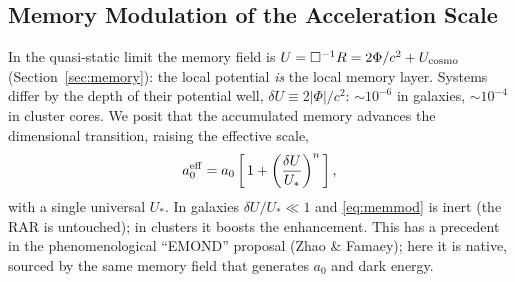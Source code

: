 \documentclass[11pt,a4paper]{article}
\begin{document}
\begin{onehalfspacing}
\subsection{Memory Modulation of the Acceleration Scale}
In the quasi-static limit the memory field is $U=\Box^{-1}R = 2\Phi/c^2 + U_{\rm cosmo}$ (Section~\ref{sec:memory}): the local potential \emph{is} the local memory layer. Systems differ by the depth of their potential well, $\delta U \equiv 2|\Phi|/c^2$: $\sim10^{-6}$ in galaxies, $\sim10^{-4}$ in cluster cores. We posit that the accumulated memory advances the dimensional transition, raising the effective scale,
\begin{equation}
a_0^{\rm eff} = a_0\left[\,1 + \left(\frac{\delta U}{U_*}\right)^{n}\,\right],
\label{eq:memmod}
\end{equation}
with a single universal $U_*$. In galaxies $\delta U/U_*\ll1$ and \eqref{eq:memmod} is inert (the RAR is untouched); in clusters it boosts the enhancement. This has a precedent in the phenomenological ``EMOND'' proposal (Zhao \& Famaey); here it is native, sourced by the same memory field that generates $a_0$ and dark energy.

\end{onehalfspacing}
\end{document}
